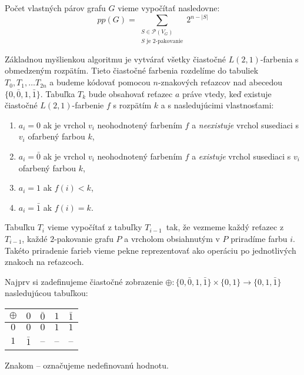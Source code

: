 \begin{pozn}
    \label{pp_g}
    Počet vlastných párov grafu $G$ vieme vypočítať nasledovne:
    $$pp(G) = \sum_{\substack{S \in \mathcal{P}(V_G) \\ S \textrm{ je } 2 \textrm{-pakovanie}}} 2^{n - |S|}$$
\end{pozn}

Základnou myšlienkou algoritmu je vytvárať všetky čiastočné $L(2,1)$-farbenia s obmedzeným rozpätím.
Tieto čiastočné farbenia rozdelíme do tabuliek $T_0, T_1, \ldots T_{2n}$ a budeme kódovať pomocou
$n$-znakových reťazcov nad abecedou $\{0, \bar{0}, 1, \bar{1}\}$. Tabuľka $T_k$ bude obsahovať
reťazec $a$ práve vtedy, keď existuje čiastočné $L(2,1)$-farbenie $f$ s rozpätím $k$ a s nasledujúcimi vlastnosťami:

\begin{enumerate}
    \item $a_i = 0$ ak je vrchol $v_i$ neohodnotený farbením $f$ a \emph{neexistuje} vrchol susediaci s $v_i$ ofarbený farbou $k$,
    \item $a_i = \bar{0}$ ak je vrchol $v_i$ neohodnotený farbením $f$ a \emph{existuje} vrchol susediaci s $v_i$ ofarbený farbou $k$,
    \item $a_i = 1$ ak $f(i) < k$,
    \item $a_i = \bar{1}$ ak $f(i) = k$.
\end{enumerate}

Tabuľku $T_i$ vieme vypočítať z tabuľky $T_{i-1}$ tak, že vezmeme každý reťazec z $T_{i-1}$, každé
$2$-pakovanie grafu $P$ a vrcholom obsiahnutým v $P$ priradíme farbu $i$. Takéto priradenie farieb
vieme pekne reprezentovať ako operáciu po jednotlivých znakoch na reťazcoch.

Najprv si zadefinujeme čiastočné zobrazenie $\oplus : \{ 0, \bar{0}, 1, \bar{1}\} \times \{ 0, 1 \} \rightarrow \{0, 1, \bar{1}\}$
nasledujúcou tabuľkou:

\begin{tabular}{c | c c c c}
    $\oplus$ & $0$ & $\bar{0}$ & $1$ & $\bar{1}$ \\
    \hline
    $0$ & $0$ & $0$ & $1$ & $1$ \\
    $1$ & $\bar{1}$ & -- & -- & -- \\
\end{tabular}

Znakom -- označujeme nedefinovanú hodnotu.

